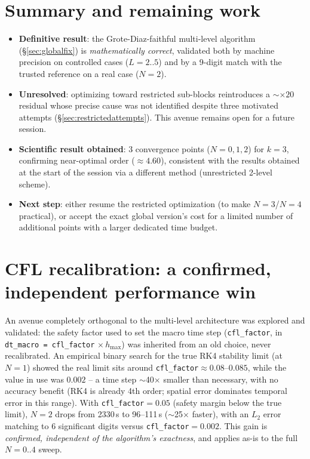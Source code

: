 \documentclass[11pt]{article}
\begin{document}
\section{Summary and remaining work}

\begin{itemize}
  \item \textbf{Definitive result}: the Grote-Diaz-faithful multi-level
  algorithm (\S\ref{sec:globalfix}) is \emph{mathematically correct},
  validated both by machine precision on controlled cases ($L=2..5$)
  and by a 9-digit match with the trusted reference on a real case
  ($N=2$).
  \item \textbf{Unresolved}: optimizing toward restricted sub-blocks
  reintroduces a $\sim\times20$ residual whose precise cause was not
  identified despite three motivated attempts
  (\S\ref{sec:restrictedattempts}). This avenue remains open for a
  future session.
  \item \textbf{Scientific result obtained}: 3 convergence points
  ($N=0,1,2$) for $k=3$, confirming near-optimal order
  ($\approx4.60$), consistent with the results obtained at the start
  of the session via a different method (unrestricted 2-level scheme).
  \item \textbf{Next step}: either resume the restricted optimization
  (to make $N=3$/$N=4$ practical), or accept the exact global version's
  cost for a limited number of additional points with a larger
  dedicated time budget.
\end{itemize}

\section{CFL recalibration: a confirmed, independent performance win}
\label{sec:cflfix}

An avenue completely orthogonal to the multi-level architecture was
explored and validated: the safety factor used to set the macro time
step (\texttt{cfl\_factor}, in \texttt{dt\_macro = cfl\_factor}
$\times\, h_{\max}$) was inherited from an old choice, never
recalibrated. An empirical binary search for the true RK4 stability
limit (at $N=1$) showed the real limit sits around
\texttt{cfl\_factor}$\approx 0.08$--$0.085$, while the value in use was
$0.002$ -- a time step $\sim$40$\times$ smaller than necessary, with no
accuracy benefit (RK4 is already 4th order; spatial error dominates
temporal error in this range). With \texttt{cfl\_factor}$=0.05$
(safety margin below the true limit), $N=2$ drops from 2330\,s to
96--111\,s ($\sim$25$\times$ faster), with an $L_2$ error matching to 6
significant digits versus \texttt{cfl\_factor}$=0.002$. This gain is
\emph{confirmed, independent of the algorithm's exactness}, and applies
as-is to the full $N=0..4$ sweep.
\end{document}
